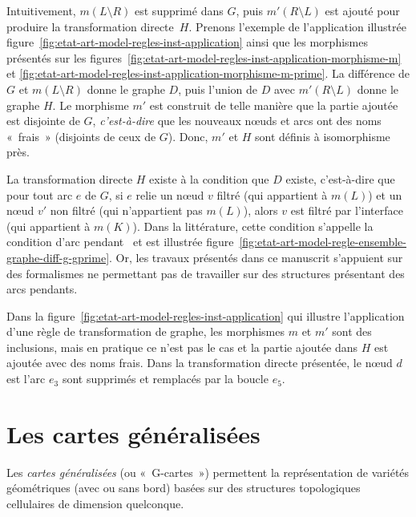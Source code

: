 Intuitivement, $m(L \setminus R)$ est supprimé dans $G$, puis $m'(R \setminus L)$ est ajouté
pour produire la transformation directe~$H$. %
Prenons l'exemple de l'application illustrée
figure~\ref{fig:etat-art-model-regles-inst-application} ainsi que les morphismes présentés sur les figures~\ref{fig:etat-art-model-regles-inst-application-morphisme-m} et
\ref{fig:etat-art-model-regles-inst-application-morphisme-m-prime}. %
La différence de \(G\) et \(m(L \setminus R)\) donne le graphe \(D\), puis l'union de
\(D\) avec \(m'(R \setminus L)\) donne le graphe \(H\). %
Le morphisme $m'$ est construit de telle manière que la partie ajoutée est
disjointe de $G$, \textit{c'est-à-dire } que les nouveaux n\oe uds et arcs ont des noms
«~frais~» (disjoints de ceux de $G$). Donc, $m'$ et $H$ sont définis à
isomorphisme près. %

\begin{remarque}
	La transformation directe $H$ existe à la condition que $D$ existe,
  c'est-à-dire que pour tout arc $e$ de $G$, si $e$ relie un n\oe ud $v$ filtré
  (qui appartient à $m(L)$) et un n\oe ud $v'$ non filtré (qui n'appartient pas
  $m(L)$), alors $v$ est filtré par l'interface (qui appartient à $m(K)$). %
	Dans la littérature, cette condition s'appelle la condition d'arc
  pendant~\cite{ehrig2006fundamentals} et est illustrée
  figure~\ref{fig:etat-art-model-regle-ensemble-graphe-diff-g-gprime}. %
  Or, les travaux présentés dans ce manuscrit s'appuient sur des formalismes ne
  permettant pas de travailler sur des structures présentant des arcs
  pendants. %
\end{remarque}


Dans la figure~\ref{fig:etat-art-model-regles-inst-application} qui illustre
l'application d'une règle de transformation de graphe, les morphismes $m$ et
$m'$ sont des inclusions, mais en pratique ce n'est pas le cas et la partie
ajoutée dans $H$ est ajoutée avec des noms frais. %
Dans la transformation directe présentée, le n\oe ud $d$ est l'arc $e_{3}$
sont supprimés et remplacés par la boucle $e_{5}$. %



\section[Les cartes généralisées]{Les cartes généralisées}
\label{sec:etat-art-model-regles-gcartes}



Les \emph{cartes généralisées} (ou «~G-cartes~»)
\cite{lienhardt1991topological,Damiand-Lienhardt14} permettent la représentation
de variétés géométriques (avec ou sans bord) basées sur des structures
topologiques cellulaires de dimension quelconque.

